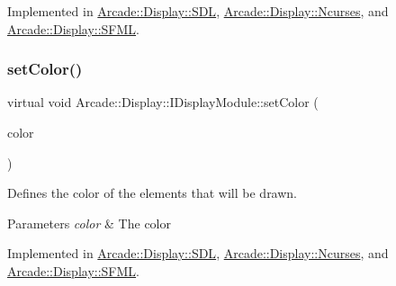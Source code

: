 Implemented in \mbox{\hyperlink{classArcade_1_1Display_1_1SDL_aa3bd454c083beb16300bb799ed268ef7}{Arcade\+::\+Display\+::\+S\+DL}}, \mbox{\hyperlink{classArcade_1_1Display_1_1Ncurses_af660e53523f4d13cc33612ac94c7da97}{Arcade\+::\+Display\+::\+Ncurses}}, and \mbox{\hyperlink{classArcade_1_1Display_1_1SFML_a88bb03b669afd0df748fd66bf24d45f3}{Arcade\+::\+Display\+::\+S\+F\+ML}}.

\mbox{\label{classArcade_1_1Display_1_1IDisplayModule_a9f81148f93a249d6fc91307819911b4e}} 
\subsubsection{\texorpdfstring{setColor()}{setColor()}}
{\footnotesize\ttfamily virtual void Arcade\+::\+Display\+::\+I\+Display\+Module\+::set\+Color (\begin{DoxyParamCaption}\item[{\mbox{\hyperlink{classArcade_1_1Display_1_1IDisplayModule_ae0a776be9163d096051c522e21c007b2}{I\+Display\+Module\+::\+Colors}}}]{color }\end{DoxyParamCaption})\hspace{0.3cm}{\ttfamily [pure virtual]}}



Defines the color of the elements that will be drawn. 


\begin{DoxyParams}{Parameters}
{\em color} & The color \\
\hline
\end{DoxyParams}


Implemented in \mbox{\hyperlink{classArcade_1_1Display_1_1SDL_a857d2a5ab8266a1e11f528f398e3f55d}{Arcade\+::\+Display\+::\+S\+DL}}, \mbox{\hyperlink{classArcade_1_1Display_1_1Ncurses_a2b9c5de7068fcf6c85b0201d5de0fade}{Arcade\+::\+Display\+::\+Ncurses}}, and \mbox{\hyperlink{classArcade_1_1Display_1_1SFML_aee515eb3ff41dc4f23a0115d2bc4f4a7}{Arcade\+::\+Display\+::\+S\+F\+ML}}.

\mbox{\label{classArcade_1_1Display_1_1IDisplayModule_adc5d499229aa5899bbd4bae14f00cb27}} 
